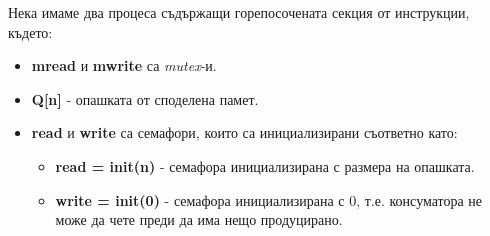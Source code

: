 \documentclass[fleqn,12pt]{article}
\begin{document}
    Нека имаме два процеса съдържащи горепосочената секция от инструкции, където:
    \begin{itemize}
        \item \textbf{mread} и \textbf{mwrite} са \textit{mutex}-и.
        \item \textbf{Q[n]} - опашката от споделена памет.
        \item \textbf{read} и \textbf{write} са семафори, които са инициализирани съответно като:
        \begin{itemize}
            \item \textbf{read = init(n)} - семафора инициализирана с размера на опашката.
            \item \textbf{write = init(0)} - семафора инициализирана с 0, т.е. консуматора не може да чете преди да има нещо продуцирано.
        \end{itemize}
    \end{itemize}
\end{document}
